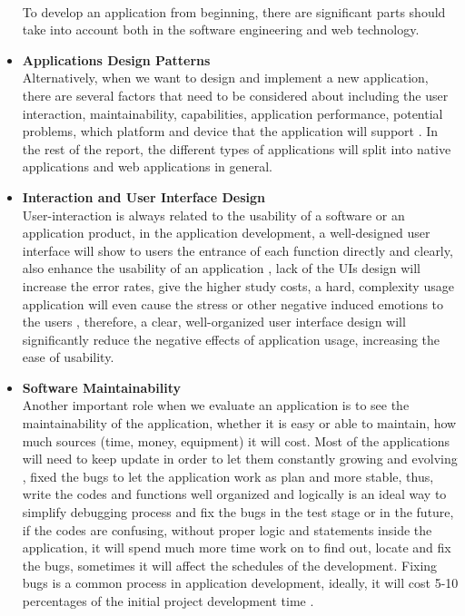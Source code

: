 \documentclass[12pt]{article}
\begin{document}
\begin{itemize}
\\To develop an application from beginning, there are significant parts should take into account both in the software engineering and web technology.
\item\textbf{Applications Design Patterns}
\\Alternatively, when we want to design and implement a new application, there are several factors that need to be considered about including the user interaction, maintainability, capabilities, application performance, potential problems, which platform and device that the application will support \cite{vora2009web}. In the rest of the report, the different types of applications will split into native applications and web applications in general.
\item\textbf{Interaction and User Interface Design}
\\User-interaction is always related to the usability of a software or an application product, in the application development, a well-designed user interface will show to users the entrance of each function directly and clearly, also enhance the usability of an application \cite{Oppermann2002}, lack of the UIs design will increase the error rates, give the higher study costs, a hard, complexity usage application will even cause the stress or other negative induced emotions to the users \cite{Oppermann2002}, therefore, a clear, well-organized user interface design will significantly reduce the negative effects of application usage, increasing the ease of usability.
\item\textbf{Software Maintainability}
\\Another important role when we evaluate an application is to see the maintainability of the application, whether it is easy or able to maintain, how much sources (time, money, equipment) it will cost. Most of the applications will need to keep update in order to let them constantly growing and evolving \cite{4221621}, fixed the bugs to let the application work as plan and more stable, thus, write the codes and functions well organized and logically is an ideal way to simplify debugging process and fix the bugs in the test stage or in the future, if the codes are confusing, without proper logic and statements inside the application, it will spend much more time work on to find out, locate and fix the bugs, sometimes it will affect the schedules of the development. Fixing bugs is a common process in application development, ideally, it will cost 5-10 percentages of the initial project development time \cite{bennett2000software}.

\end{itemize}
\end{document}
